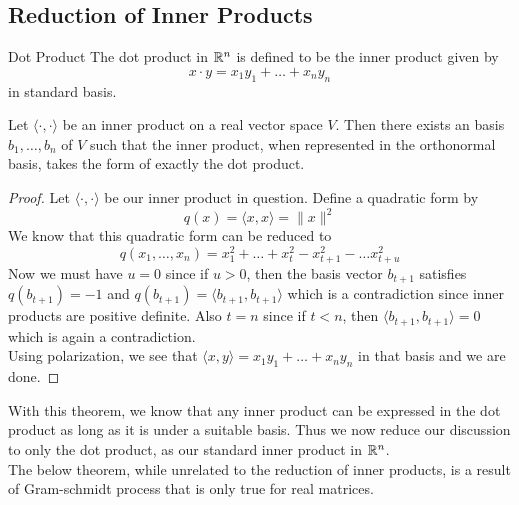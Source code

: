 \documentclass[a4paper]{article}
\begin{document}
\subsection{Reduction of Inner Products}
\begin{defn}{Dot Product}{} The dot product in $\mathbb{R}^n$ is defined to be the inner product given by $$x\cdot y=x_1y_1+\dots+x_ny_n$$ in standard basis. 
\end{defn}

\begin{thm}{}{} Let $\langle \cdot,\cdot\rangle$ be an inner product on a real vector space $V$. Then there exists an basis $b_1,\dots,b_n$ of $V$ such that the inner product, when represented in the orthonormal basis, takes the form of exactly the dot product. 
\begin{proof}
Let $\langle \cdot,\cdot\rangle$ be our inner product in question. Define a quadratic form by $$q(x)=\langle x,x\rangle=\|x\|^2$$ We know that this quadratic form can be reduced to $$q(x_1,\dots,x_n)=x_1^2+\dots+x_t^2-x_{t+1}^2-\dots x_{t+u}^2$$ Now we must have $u=0$ since if $u>0$, then the basis vector $b_{t+1}$ satisfies $q(b_{t+1})=-1$ and $q(b_{t+1})=\langle b_{t+1},b_{t+1}\rangle$ which is a contradiction since inner products are positive definite. Also $t=n$ since if $t<n$, then $\langle b_{t+1},b_{t+1}\rangle=0$ which is again a contradiction. \\
Using polarization, we see that $\langle x,y\rangle=x_1y_1+\dots+x_ny_n$ in that basis and we are done. 
\end{proof}
\end{thm}

With this theorem, we know that any inner product can be expressed in the dot product as long as it is under a suitable basis. Thus we now reduce our discussion to only the dot product, as our standard inner product in $\mathbb{R}^n$. \\
The below theorem, while unrelated to the reduction of inner products, is a result of Gram-schmidt process that is only true for real matrices. 
\end{document}
